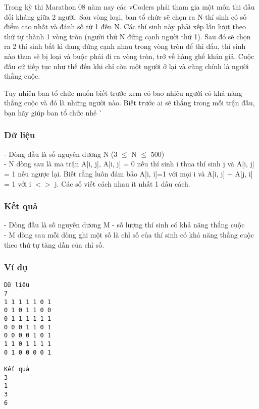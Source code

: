 



   Trong kỳ thi Marathon 08 năm nay các vCoders phải tham gia một môn thi đấu đối kháng giữa 2 người. Sau vòng loại, ban tổ chức sẽ chọn ra N thí sinh có số điểm cao nhất và đánh số từ 1 đến N. Các thí sinh này phải xếp lần lượt theo thứ tự thành 1 vòng tròn (người thứ N đứng cạnh người thứ 1). Sau đó sẽ chọn ra 2 thí sinh bất kì đang đứng cạnh nhau trong vòng tròn để thi đấu, thí sinh nào thua sẽ bị loại và buộc phải đi ra vòng tròn, trở về hàng ghế khán giả. Cuộc đấu cứ tiếp tục như thế đến khi chỉ còn một người ở lại và cũng chính là người thắng cuộc.  

   Tuy nhiên ban tổ chức muốn biết trước xem có bao nhiêu người có khả năng thắng cuộc và đó là những người nào. Biết trước ai sẽ thắng trong mỗi trận đấu, bạn hãy giúp ban tổ chức nhé ^^  

\subsubsection{   Dữ liệu  }

   - Dòng đầu là số nguyên dương N (3  $\le$  N  $\le$  500)   
\\   - N dòng sau là ma trận A[i, j], A[i, j] = 0 nếu thí sinh i thua thí sinh j và A[i, j] = 1 nếu ngược lại. Biết rằng luôn đảm bảo A[i, i]=1 với mọi i và A[i, j] + A[j, i] = 1 với i $<$$>$ j. Các số viết cách nhau ít nhất 1 dấu cách.  

\subsubsection{   Kết quả  }

   - Dòng đầu là số nguyên dương M - số lượng thí sinh có khả năng thắng cuộc   
\\   - M dòng sau mỗi dòng ghi một số là chỉ số của thí sinh có khả năng thắng cuộc theo thứ tự tăng dần của chỉ số.  

\subsubsection{   Ví dụ  }
\begin{verbatim}
Dữ liệu
7
1 1 1 1 1 0 1
0 1 0 1 1 0 0
0 1 1 1 1 1 1
0 0 0 1 1 0 1
0 0 0 0 1 0 1
1 1 0 1 1 1 1
0 1 0 0 0 0 1

Kết quả
3
1
3
6
\end{verbatim}

